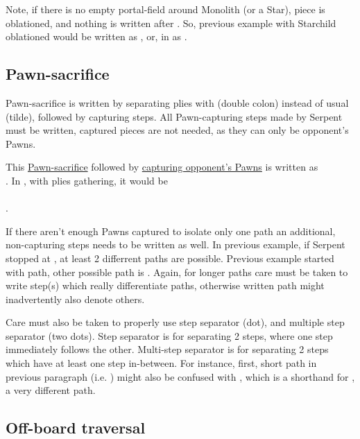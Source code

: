 Note, if there is no empty portal-field around Monolith (or a Star), piece is oblationed, and nothing is written
after \alg{||}. So, previous example with Starchild oblationed would be written as , or, in 
as \alg{[If5-c3]||}.

\subsection*{Pawn-sacrifice}
\label{sec:Appendix/Notation/Pawn-sacrifice}

Pawn-sacrifice is written by separating plies with \alg{::} (double colon) instead of usual \alg{\~{}} (tilde),
followed by capturing steps. All Pawn-capturing steps made by Serpent must be written, captured pieces are not
needed, as they can only be opponent's Pawns.

This \hyperref[fig:scn_tr_21_pawn_sacrifice_init]{Pawn-sacrifice} followed by
\hyperref[fig:scn_tr_22_pawn_sacrifice_end]{capturing opponent's Pawns} is written as \\
. In , with plies gathering, it would be \\
\alg{[Sr14-m15]\~{}[Am15-m11]::}\\
\alg{[Sm15..m17*..m19*.l20*.m21*.n20*.o21*]}.

If there aren't enough Pawns captured to isolate only one path an additional, non-capturing steps needs to be
written as well. In previous example, if Serpent stopped at , at least 2 differrent paths are possible.
Previous example started with  path, other possible path is
. Again, for longer paths care must be taken to write step(s) which really
differentiate paths, otherwise written path might inadvertently also denote others.

Care must also be taken to properly use step separator  (dot), and multiple step separator  (two
dots). Step separator  is for separating 2 steps, where one step immediately follows the other. Multi-step
separator  is for separating 2 steps which have at least one step in-between. For instance, first, short
path in previous paragraph (i.e. ) might also be confused with
, which is a shorthand for , a very
different path.

\subsection*{Off-board traversal}
\label{sec:Appendix/Notation/Off-board traversal}

